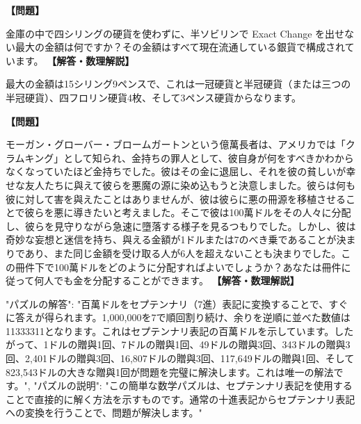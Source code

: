\documentclass[10pt,a4paper,oneside,openany]{ltjsbook}
\begin{document}
\begin{tcolorbox}[colback=softblue,colframe=primaryblue,title=\textbf{第 15 問：ポケットマネー （原題: POCKET MONEY.）},arc=2mm,boxrule=1pt,breakable]
\textbf{【問題】}\par\vspace{0.3em}
金庫の中で四シリングの硬貨を使わずに、半ソビリンで Exact Change を出せない最大の金額は何ですか？その金額はすべて現在流通している銀貨で構成されています。
\tcblower
\textbf{【解答・数理解説】}\par\vspace{0.3em}
最大の金額は15シリング9ペンスで、これは一冠硬貨と半冠硬貨（または三つの半冠硬貨）、四フロリン硬貨4枚、そして3ペンス硬貨からなります。
\end{tcolorbox}

\begin{tcolorbox}[colback=softblue,colframe=primaryblue,title=\textbf{第 16 問：THE MILLIONAIRE'S PERPLEXITY.},arc=2mm,boxrule=1pt,breakable]
\textbf{【問題】}\par\vspace{0.3em}
モーガン・グローバー・ブロームガートンという億萬長者は、アメリカでは「クラムキング」として知られ、金持ちの罪人として、彼自身が何をすべきかわからなくなっていたほど金持ちでした。彼はその金に退屈し、それを彼の貧しいが幸せな友人たちに與えて彼らを悪魔の源に染め込もうと決意しました。彼らは何も彼に対して害を與えたことはありませんが、彼は彼らに悪の冊源を移植させることで彼らを悪に導きたいと考えました。そこで彼は100萬ドルをその人々に分配し、彼らを見守りながら急速に墮落する様子を見るつもりでした。しかし、彼は奇妙な妄想と迷信を持ち、與える金額が1ドルまたは7のべき乗であることが決まりであり、また同じ金額を受け取る人が6人を超えないことも決まりでした。この冊件下で100萬ドルをどのように分配すればよいでしょうか？あなたは冊件に従って何人でも金を分配することができます。
\tcblower
\textbf{【解答・数理解説】}\par\vspace{0.3em}
{
"パズルの解答": "百萬ドルをセプテンナリ（7進）表記に変換することで、すぐに答えが得られます。1,000,000を7で順回割り続け、余りを逆順に並べた数値は11333311となります。これはセプテンナリ表記の百萬ドルを示しています。したがって、1ドルの贈與1回、7ドルの贈與1回、49ドルの贈與3回、343ドルの贈與3回、2,401ドルの贈與3回、16,807ドルの贈與3回、117,649ドルの贈與1回、そして823,543ドルの大きな贈與1回が問題を完璧に解決します。これは唯一の解法です。",
"パズルの説明": "この簡単な数学パズルは、セプテンナリ表記を使用することで直接的に解く方法を示すものです。通常の十進表記からセプテンナリ表記への変換を行うことで、問題が解決します。"
}
\end{tcolorbox}
\end{document}
